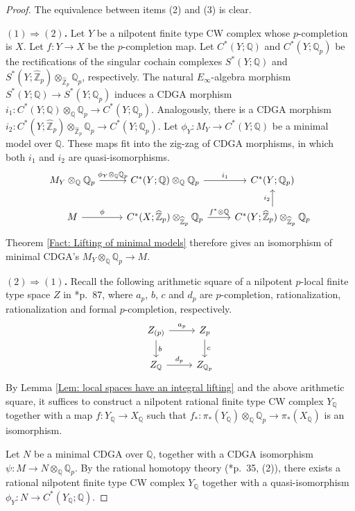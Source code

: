\documentclass[11pt]{amsart}
\theoremstyle{definition}
\numberwithin{equation}{section}
\numberwithin{equation}{section}
\newcommand\QQ{\mathbb{Q}}
\newcommand\ZZ{\mathbb{Z}}
\begin{document}
\begin{proof}
The equivalence between items (2) and (3) is clear. 

\textbf{$(1)\Rightarrow (2)$.} Let $Y$ be a nilpotent finite type CW complex whose $p$-completion is $X$. Let $f:Y\rightarrow X$ be the $p$-completion map. Let $C^*(Y;\QQ)$ and $C^*(Y;\QQ_p)$ be the rectifications of the singular cochain complexes $S^*(Y;\QQ)$ and $S^*(Y;\widehat{\ZZ}_p)\otimes_{\widehat{\ZZ}_p}\QQ_p$, respectively. The natural $E_{\infty}$-algebra morphism $S^*(Y;\QQ)\rightarrow S^*(Y;\QQ_p)$ induces a CDGA morphism $i_1:C^*(Y;\QQ)\otimes_{\QQ} \QQ_p\rightarrow C^*(Y;\QQ_p)$. Analogously, there is a CDGA morphism $i_2:C^*(Y;\widehat{\ZZ}_p)\otimes_{\widehat{\ZZ}_p}\QQ_p\rightarrow C^*(Y;\QQ_p)$. Let $\phi_Y:M_Y\rightarrow C^*(Y;\QQ)$ be a minimal model over $\QQ$. These maps fit into the zig-zag of CDGA morphisms, in which both $i_1$ and $i_2$ are quasi-isomorphisms.
\[
\begin{tikzcd}
    M_Y\otimes_{\QQ} \QQ_p \arrow[r,"\phi_Y\otimes_{\QQ}\QQ_p"] & C^*(Y;\QQ)\otimes_{\QQ} \QQ_p \arrow[r,"i_1"] & C^*(Y;\QQ_p) \\
    M \arrow[r,"\phi"] & C^*(X;\widehat{\ZZ}_p)\otimes_{\widehat{\ZZ}_p} \QQ_p \arrow[r,"f^*\otimes \QQ"] &  C^*(Y;\widehat{\ZZ}_p)\otimes_{\widehat{\ZZ}_p} \QQ_p  \arrow[u,"i_2"]
\end{tikzcd}
\]
Theorem \ref{Fact: Lifting of minimal models} therefore gives an isomorphism of minimal CDGA's $M_Y\otimes_{\QQ}\QQ_p\rightarrow M$. 

\textbf{$(2)\Rightarrow (1)$.} 
Recall the following arithmetic square of a nilpotent $p$-local finite type space $Z$ in \cite{Sullivan-MIT-notes}*{p.~87}, where $a_p$, $b$, $c$ and $d_p$ are $p$-completion, rationalization, rationalization and formal $p$-completion, respectively.
\[
\begin{tikzcd}
    Z_{(p)} \arrow[r,"a_p"] \arrow[d,"b"] & Z_p \arrow[d,"c"] \\
    Z_{\QQ} \arrow[r,"d_{p}"] & Z_{\QQ_{p}}
\end{tikzcd}
\]
By Lemma \ref{Lem: local spaces have an integral lifting} and the above arithmetic square, it suffices to construct a nilpotent rational finite type CW complex $Y_{\QQ}$ together with a map $f:Y_{\QQ}\rightarrow X_{\QQ}$ such that $f_*:\pi_*(Y_{\QQ})\otimes_{\QQ} \QQ_p\rightarrow \pi_*(X_{\QQ})$ is an isomorphism.

Let $N$ be a minimal CDGA over $\QQ$, together with a CDGA isomorphism $\psi:M\rightarrow N\otimes_{\QQ} \QQ_p$. By the rational homotopy theory (\cite{Deligne-Griffiths-Morgan-Sullivan-formality}*{p.~35, (2)}), there exists a rational nilpotent finite type CW complex $Y_{\QQ}$ together with a quasi-isomorphism $\phi_Y:N\rightarrow C^*(Y_{\QQ};\QQ)$.


\end{proof}
\end{document}
